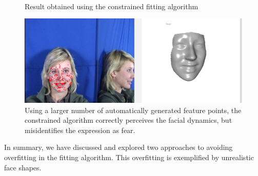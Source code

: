 \documentclass[11pt,a4paper,twoside]{report}
\begin{document}
\begin{figure}[H]
\centering
{}\\
\caption{Result obtained using the constrained fitting algorithm}\label{fg:constrained1}
\end{figure}



\begin{figure}[H]
\includegraphics[scale=0.40]{images/const_2.png}
\caption{Using a larger number of automatically generated feature points, the
  constrained algorithm correctly perceives the facial dynamics, but
  misidentifies the expression as fear.}\label{fg:constrained2}
\end{figure}

In summary, we have discussed and explored two approaches to avoiding
overfitting in the fitting algorithm. This overfitting is exemplified by
unrealistic face shapes. 
\end{document}
